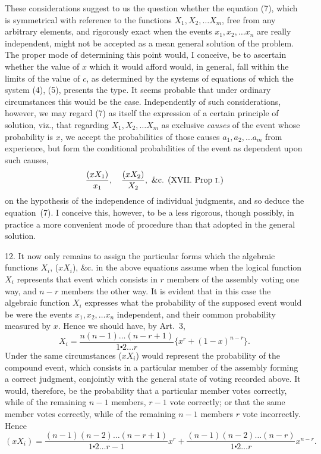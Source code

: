 \documentclass[oneside]{book}
\begin{document}
These considerations suggest to us the question whether the
equation (7), which is symmetrical with reference to the functions $X_1, X_2,\dotsc X_m$, free from any arbitrary elements, and rigorously exact when the events $x_1, x_2,\dotsc x_n$ are really independent,
might not be accepted as a mean general solution of the problem.
The proper mode of determining this point would, I conceive, be
to ascertain whether the value of $x$ which it would afford would,
in general, fall within the limits of the value of $c$, as determined
by the systems of equations of which the system (4), (5), presents
the type. It seems probable that under ordinary circumstances
this would be the case. Independently of such considerations,
however, we may regard (7) as itself the expression of a certain
principle of solution, viz., that regarding
$X_1, X_2,\dotsc X_m$ as exclusive \emph{causes} of the event whose
probability is $x$, we accept the
probabilities of those causes $a_1, a_2,\dotsc a_m$ from experience, but form
the conditional probabilities of the event as dependent upon such
causes,
\[
  \frac{(x X_1)}{x_1},\quad \frac{(x X_2)}{X_2},
  \text{ \&c. (XVII. Prop~\textsc{i.})}
\]
on the hypothesis of the independence of individual judgments,
and so deduce the equation~(7). I conceive this, however, to be
a less rigorous, though possibly, in practice a more convenient
mode of procedure than that adopted in the general solution.

12. It now only remains to assign the particular forms which
the algebraic functions $X_i$, ($x X_i$), \&c. in the above equations assume when the logical function $X_i$ represents that event which
consists in $r$ members of the assembly voting one way, and $n-r$
members the other way. It is evident that in this case the algebraic function $X_i$ expresses what the probability of the supposed
event would be were the events $x_1, x_2,\dotsc x_n$ independent, and
their common probability measured by $x$. Hence we should
have, by Art.~3,
\[
  X_i = \frac{n(n-1)\dotsc (n-r+1)}{1\centerdot 2\dotsc r}
        \{ x^r + (1-x)^{n-r} \}.
\]
Under the same circumstances ($xX_i$) would represent the probability of the compound event, which consists in a particular
member of the assembly forming a correct judgment, conjointly
with the general state of voting recorded above. It would,
therefore, be the probability that a particular member votes correctly, while of the remaining $n-1$ members, $r-1$ vote correctly; or that the same member votes correctly, while of the
remaining $n-1$ members $r$ vote incorrectly. Hence
\[
  (xX_i)
= \frac{(n-1)(n-2)\dotsc (n-r+1)}{1\centerdot 2\dotsc r-1}x^r
+ \frac{(n-1)(n-2)\dotsc (n-r)}{1\centerdot 2\dotsc r}x^{n-r}.
\]
\end{document}
